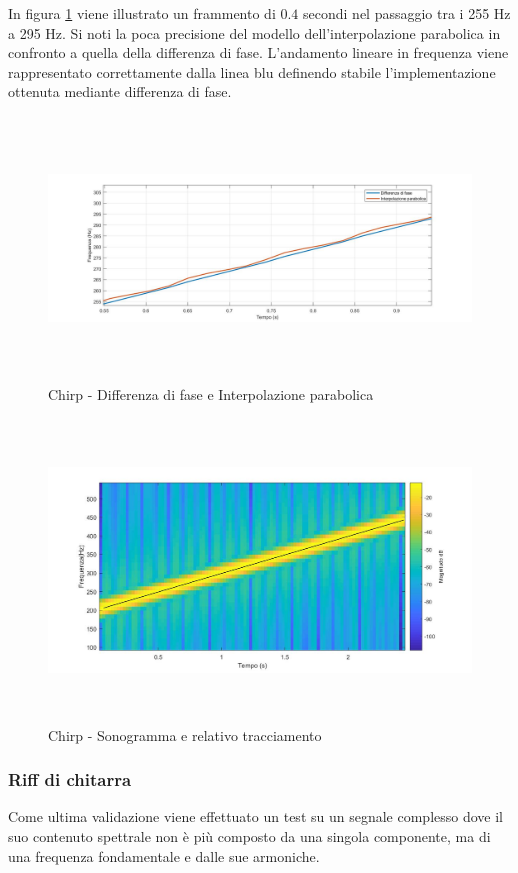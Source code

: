 \documentclass[12pt]{report}
\begin{document}
In figura \ref{fig:chirp} viene illustrato un frammento di $0.4$ secondi nel passaggio tra i 255 Hz a 295 Hz. Si noti la poca precisione del modello dell'interpolazione parabolica in confronto a quella della differenza di fase. L'andamento lineare in frequenza viene rappresentato correttamente dalla linea blu definendo stabile l'implementazione ottenuta mediante differenza di fase.

\begin{figure}[htbp]
\centerline{\includegraphics[height=70mm]{img/chirp}}
\caption{Chirp - Differenza di fase e Interpolazione parabolica}
\label{fig:chirp}
\end{figure}

\begin{figure}[htbp]
\centerline{\includegraphics[height=80mm]{img/chirp_sono}}
\caption{Chirp - Sonogramma e relativo tracciamento}
\label{fig:chirp_sono}
\end{figure}

		\subsubsection{Riff di chitarra}
		\label{cap3sec2_3_2}
		Come ultima validazione viene effettuato un test su un segnale complesso dove il suo contenuto spettrale non è più composto da una singola componente, ma di una frequenza fondamentale e dalle sue armoniche.
\end{document}
